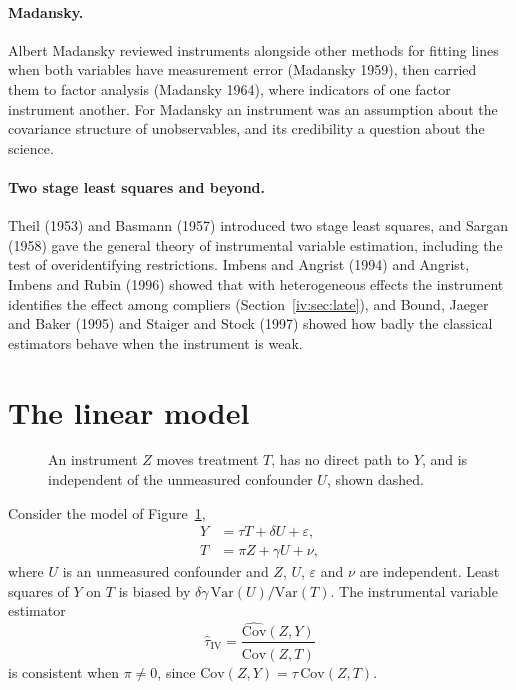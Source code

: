 \paragraph{Madansky.} Albert Madansky reviewed instruments alongside other methods for fitting lines when both variables have measurement error (Madansky 1959), then carried them to factor analysis (Madansky 1964), where indicators of one factor instrument another. For Madansky an instrument was an assumption about the covariance structure of unobservables, and its credibility a question about the science.

\paragraph{Two stage least squares and beyond.} Theil (1953) and Basmann (1957) introduced two stage least squares, and Sargan (1958) gave the general theory of instrumental variable estimation, including the test of overidentifying restrictions.  Imbens and Angrist (1994) and Angrist, Imbens and Rubin (1996) showed that with heterogeneous effects the instrument identifies the effect among compliers (Section~\ref{iv:sec:late}), and Bound, Jaeger and Baker (1995) and Staiger and Stock (1997) showed how badly the classical estimators behave when the instrument is weak.

\section{The linear model}
\begin{figure}[ht]
\centering
{}
\caption{An instrument $Z$ moves treatment $T$, has no direct path to $Y$, and is independent of the unmeasured confounder $U$, shown dashed.}
\label{fig:dagiv}
\end{figure}


Consider the model of Figure~\ref{fig:dagiv},
\begin{align*}
Y &= \tau T + \delta U + \varepsilon, \\
T &= \pi Z + \gamma U + \nu,
\end{align*}
where $U$ is an unmeasured confounder and $Z$, $U$, $\varepsilon$ and $\nu$ are independent. Least squares of $Y$ on $T$ is biased by $\delta\gamma\,\mathrm{Var}(U)/\mathrm{Var}(T)$. The instrumental variable estimator
\[
\hat\tau_{\mathrm{IV}} = \frac{\widehat{\mathrm{Cov}}(Z, Y)}{\widehat{\mathrm{Cov}}(Z, T)}
\]
is consistent when $\pi \neq 0$, since $\mathrm{Cov}(Z, Y) = \tau\,\mathrm{Cov}(Z, T)$.

